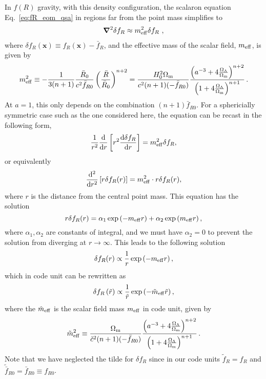In $f(R)$ gravity, with this density configuration, the scalaron equation Eq.~\eqref{eq:fR_eom_qsa} in regions far from the point mass simplifies to 
\begin{align}
    \boldsymbol{\nabla}^2 \delta f_R \approx m_{\rm eff}^2 \delta f_R \ , \label{eqn:fR_eom_pointmass_far}
\end{align}%
where $\delta f_R (\bm{x}) \equiv f_R(\bm{x}) - \bar{f}_R$, and the effective mass of the scalar field, $m_{\rm eff}$, is given by
\begin{equation}
    m^2_{\rm eff} \equiv -\frac{1}{3(n+1)}\frac{\bar{R}_0}{c^2\bar{f}_{R0}}\left(\frac{\bar{R}}{\bar{R}_0}\right)^{n+2} = \frac{H_0^2\Omega_{\rm m}}{c^2(n+1) (-\bar{f}_{R0})} \frac{\qty(a^{-3} + 4\frac{\Omega_{\Lambda}}{\Omega_{\rm m}})^{n+2}}{\qty(1 + 4\frac{\Omega_{\Lambda}}{\Omega_{\rm m}})^{n+1}}\,.
\end{equation}
At $a=1$, this only depends on the combination $(n+1)\bar{f}_{R0}$. For a sphericially symmetric case such as the one considered here, the equation can be recast in the following form,
\begin{equation}
    \frac{1}{r^2}\frac{{\rm d}}{{\rm d}r}\left[r^2\frac{{\rm d}\delta{f}_R}{{\rm d}r}\right] = m^2_{\rm eff}\delta{f}_R,
\end{equation}
or equivalently 
\begin{equation}
    \frac{{\rm d}^2}{{\rm d}r^2}\left[r\delta{f}_R(r)\right] = m^2_{\rm eff}\cdot r\delta{f}_R(r),
\end{equation}
where $r$ is the distance from the central point mass. This equation has the solution 
\begin{equation}
    r\delta{f}_R(r) = \alpha_1\exp\left(-m_{\rm eff}r\right) + \alpha_2\exp\left(m_{\rm eff}r\right),
\end{equation}
where $\alpha_{1}, \alpha_2$ are constants of integral, and we must have $\alpha_2=0$ to prevent the solution from diverging at $r\rightarrow\infty$. This leads to the following solution 
\begin{equation}\label{eq:fR_point_mass_soln}
    \delta{f}_R(r) \propto \frac{1}{r}\exp\left(-m_{\rm eff}r\right),
\end{equation}
which in code unit can be rewritten as
\begin{equation}\label{eq:fR_point_mass_soln_code_unit}
    \delta{f}_R\left(\tilde{r}\right) \propto \frac{1}{\tilde{r}}\exp\left(-\tilde{m}_{\rm eff}\tilde{r}\right),
\end{equation}
where the $\tilde{m}_{\rm eff}$ is the scalar field mass $m_{\rm eff}$ in code unit, given by
\begin{equation}
    \tilde{m}_{\rm eff}^2 \equiv \frac{\Omega_{\rm m}}{\tilde{c}^2(n+1) (-\bar{f}_{R0})} \frac{\qty(a^{-3} + 4\frac{\Omega_{\Lambda}}{\Omega_{\rm m}})^{n+2}}{\qty(1 + 4\frac{\Omega_{\Lambda}}{\Omega_{\rm m}})^{n+1}}\,.
\end{equation}
Note that we have neglected the tilde for $\delta{f}_R$ since in our code units $\tilde{f}_R = f_R$ and $\tilde{\bar{f}}_{R0} = \bar{f}_{R0} \equiv f_{R0}$.

